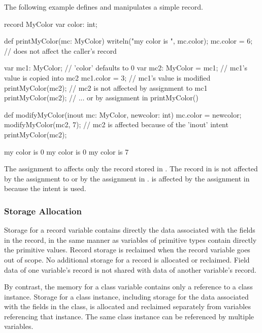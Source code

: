 \begin{example}
The following example defines and manipulates a simple record.
\begin{chapelpre}
\end{chapelpre}
\begin{chapel}
record MyColor {
  var color: int;
}

def printMyColor(mc: MyColor) {
  writeln("my color is ", mc.color);
  mc.color = 6;   // does not affect the caller's record
}

var mc1: MyColor;        // 'color' defaults to 0
var mc2: MyColor = mc1;  // mc1's value is copied into mc2
mc1.color = 3;           // mc1's value is modified
printMyColor(mc2);       // mc2 is not affected by assignment to mc1
printMyColor(mc2);       // ... or by assignment in printMyColor()

def modifyMyColor(inout mc: MyColor, newcolor: int) {
  mc.color = newcolor;
}
modifyMyColor(mc2, 7);   // mc2 is affected because of the 'inout' intent
printMyColor(mc2);
\end{chapel}
\begin{chapeloutput}
my color is 0
my color is 0
my color is 7
\end{chapeloutput}
The assignment to  affects only the record stored
in . The record in  is not affected by
the assignment to  or by the assignment in .
 is affected by the assignment in 
because the intent  is used.
\end{example}

\subsubsection{Storage Allocation}
\label{Record_Storage}

Storage for a record variable contains directly the data associated
with the fields in the record, in the same manner as variables
of primitive types contain directly the primitive values.
Record storage is reclaimed when the record variable goes out of scope.
No additional storage for a record is allocated or reclaimed.
Field data of one variable's record is not shared with data
of another variable's record.

By contrast, the memory for a class variable contains only a reference to a
class instance.  Storage for a class instance, including storage for
the data associated with the fields in the class, is allocated and reclaimed
separately from variables referencing that instance.  The same class instance
can be referenced by multiple variables.

